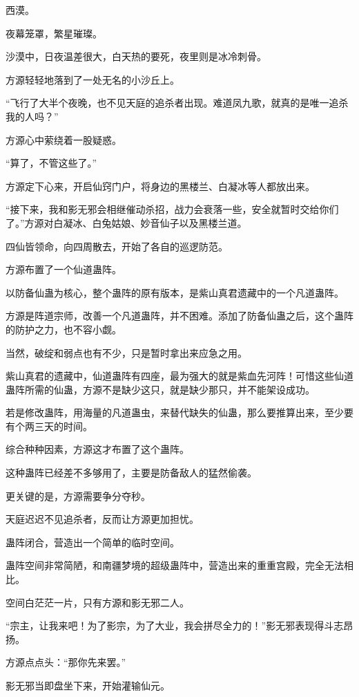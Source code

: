 
\begin{this_body}

西漠。

夜幕笼罩，繁星璀璨。

沙漠中，日夜温差很大，白天热的要死，夜里则是冰冷刺骨。

方源轻轻地落到了一处无名的小沙丘上。

“飞行了大半个夜晚，也不见天庭的追杀者出现。难道凤九歌，就真的是唯一追杀我的人吗？”

方源心中萦绕着一股疑惑。

“算了，不管这些了。”

方源定下心来，开启仙窍门户，将身边的黑楼兰、白凝冰等人都放出来。

“接下来，我和影无邪会相继催动杀招，战力会衰落一些，安全就暂时交给你们了。”方源对白凝冰、白兔姑娘、妙音仙子以及黑楼兰道。

四仙皆领命，向四周散去，开始了各自的巡逻防范。

方源布置了一个仙道蛊阵。

以防备仙蛊为核心，整个蛊阵的原有版本，是紫山真君遗藏中的一个凡道蛊阵。

方源是阵道宗师，改善一个凡道蛊阵，并不困难。添加了防备仙蛊之后，这个蛊阵的防护之力，也不容小觑。

当然，破绽和弱点也有不少，只是暂时拿出来应急之用。

紫山真君的遗藏中，仙道蛊阵有四座，最为强大的就是紫血先河阵！可惜这些仙道蛊阵所需的仙蛊，方源不是缺少这只，就是缺少那只，并不能架设成功。

若是修改蛊阵，用海量的凡道蛊虫，来替代缺失的仙蛊，那么要推算出来，至少要有个两三天的时间。

综合种种因素，方源这才布置了这个蛊阵。

这种蛊阵已经差不多够用了，主要是防备敌人的猛然偷袭。

更关键的是，方源需要争分夺秒。

天庭迟迟不见追杀者，反而让方源更加担忧。

蛊阵闭合，营造出一个简单的临时空间。

蛊阵空间非常简陋，和南疆梦境的超级蛊阵中，营造出来的重重宫殿，完全无法相比。

空间白茫茫一片，只有方源和影无邪二人。

“宗主，让我来吧！为了影宗，为了大业，我会拼尽全力的！”影无邪表现得斗志昂扬。

方源点点头：“那你先来罢。”

影无邪当即盘坐下来，开始灌输仙元。


\end{this_body}
